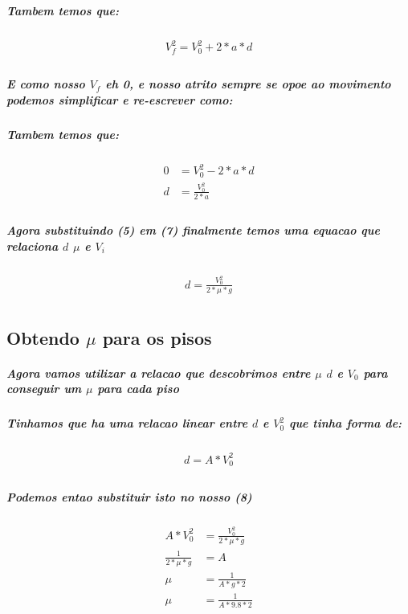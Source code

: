 \documentclass[12pt,twoside, a4paper, twocolumn]{article}
\begin{document}
\subparagraph*{Tambem temos que:}

\begin{equation}
    \begin{aligned}
        V_f^2 = V_0^2 + 2*a*d \\
    \end{aligned}
\end{equation}

\subparagraph*{E como nosso $V_f$ eh 0, e nosso atrito sempre se opoe ao movimento podemos simplificar e re-escrever como:}

\subparagraph*{Tambem temos que:}

\begin{equation}
    \begin{aligned}
        0 & = V_0^2 - 2*a*d     \\
        d & = \frac{V_0^2}{2*a} \\
    \end{aligned}
\end{equation}

\subparagraph*{Agora substituindo (5) em (7) finalmente temos uma equacao que relaciona $d$ $\mu$ e $V_i$}

\begin{equation}
    \begin{aligned}
        d  = \frac{V_0^2}{2*\mu*g} \\
    \end{aligned}
\end{equation}

\subsection{Obtendo $\mu$ para os pisos}

\subparagraph*{Agora vamos utilizar a relacao que descobrimos entre $\mu$ $d$ e $V_0$ para conseguir um $\mu$ para cada piso}

\subparagraph*{Tinhamos que ha uma relacao linear entre $d$ e $V_0^2$ que tinha forma de:}

\begin{equation}
    \begin{aligned}
        d = A * V_0^2 \\
    \end{aligned}
\end{equation}

\subparagraph*{Podemos entao substituir isto no nosso (8)}

\begin{equation}
    \begin{aligned}
        A * V_0^2         & = \frac{V_0^2}{2*\mu*g} \\
        \frac{1}{2*\mu*g} & = A                     \\
        \mu               & = \frac{1}{A*g*2}       \\
        \mu               & = \frac{1}{A*9.8*2}     \\
    \end{aligned}
\end{equation}
\end{document}
